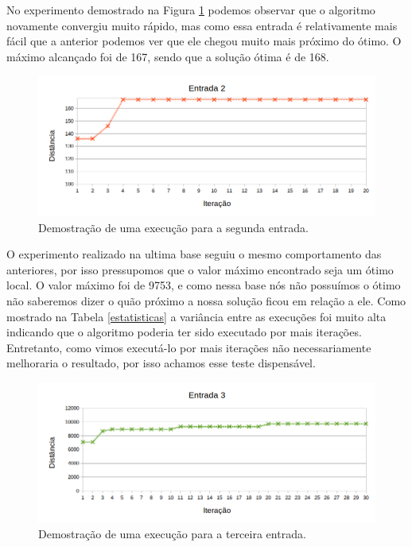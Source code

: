 \documentclass[a4paper, 12pt]{article}
\begin{document}
No experimento demostrado na Figura \ref{fig:fig2} podemos observar que o algoritmo novamente convergiu muito rápido, mas como essa entrada é relativamente mais fácil que a anterior podemos ver que ele chegou muito mais próximo do ótimo. O máximo alcançado foi de 167, sendo que a solução ótima é de 168.

\begin{figure}[!htb]
\centering
\includegraphics[scale=0.64]{entrada2.png}
\caption{Demostração de uma execução para a segunda entrada.}
\label{fig:fig2}
\end{figure}


O experimento realizado na ultima base seguiu o mesmo comportamento das anteriores, por isso pressupomos que o valor máximo encontrado seja um ótimo local. O valor máximo foi de 9753, e como nessa base nós não possuímos o ótimo não saberemos dizer o quão próximo a nossa solução ficou em relação a ele. Como mostrado na Tabela \ref{estatisticas} a variância entre as execuções foi muito alta indicando que o algoritmo poderia ter sido executado por mais iterações. Entretanto, como vimos executá-lo por mais iterações não necessariamente melhoraria o resultado, por isso achamos esse teste dispensável.


\begin{figure}[!htb]
\centering
\includegraphics[scale=0.64]{entrada3.png}
\caption{Demostração de uma execução para a terceira entrada.}
\label{fig:fig3}
\end{figure}
\end{document}
